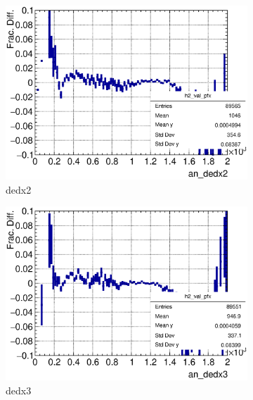 \begin{figure}[t]
\begin{subfigure}{\dbfigwid\textwidth}
           \includegraphics[width=\textwidth]{figures/sel/ans_dedx2_vs_p_pr_res_hist2d_al2_selpr_con_slice.eps}
           \caption{dedx2}
           \label{subfig:dedx2}
      \end{subfigure}
      \begin{subfigure}{\dbfigwid\textwidth}
           \includegraphics[width=\textwidth]{figures/sel/ans_dedx3_vs_p_pr_res_hist2d_al2_selpr_con_slice.eps}
           \caption{dedx3}
           \label{subfig:dedx3}
      \end{subfigure}
      \\
      \begin{subfigure}{\dbfigwid\textwidth}

\end{subfigure}
\end{figure}
